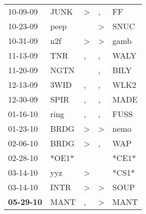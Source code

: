 \begin{supertabular}{p{0.07\textwidth}p{0.06\textwidth}p{0.02\textwidth}p{0.02\textwidth}p{0.06\textwidth}}
          10-09-09\textsuperscript{} &           JUNK\textsuperscript{} &     \textgreater &                , &             FF\textsuperscript{} \\
          10-23-09\textsuperscript{} &           peep\textsuperscript{} &                  &     \textgreater &           SNUC\textsuperscript{} \\
          10-31-09\textsuperscript{} &            n2f\textsuperscript{} &     \textgreater &     \textgreater &           gamb\textsuperscript{} \\
          11-13-09\textsuperscript{} &            TNR\textsuperscript{} &                , &                , &           WALY\textsuperscript{} \\
          11-20-09\textsuperscript{} &           NGTN\textsuperscript{} &                  &                , &           BILY\textsuperscript{} \\
          12-13-09\textsuperscript{} &           3WID\textsuperscript{} &                , &                , &           WLK2\textsuperscript{} \\
          12-30-09\textsuperscript{} &           SPIR\textsuperscript{} &                , &                , &           MADE\textsuperscript{} \\
          01-16-10\textsuperscript{} &           ring\textsuperscript{} &                , &                , &           FUSS\textsuperscript{} \\
          01-23-10\textsuperscript{} &           BRDG\textsuperscript{} &     \textgreater &     \textgreater &           nemo\textsuperscript{} \\
          02-06-10\textsuperscript{} &           BRDG\textsuperscript{} &     \textgreater &                , &            WAP\textsuperscript{} \\
          02-28-10\textsuperscript{} &                            *OE1* &                  &                  &                            *CE1* \\
          03-14-10\textsuperscript{} &            yyz\textsuperscript{} &     \textgreater &                  &                            *CS1* \\
          03-14-10\textsuperscript{} &           INTR\textsuperscript{} &     \textgreater &     \textgreater &           SOUP\textsuperscript{} \\
 \textbf{05-29-10\textsuperscript{}} &           MANT\textsuperscript{} &                , &     \textgreater &           MANT\textsuperscript{} \\

\end{supertabular}
